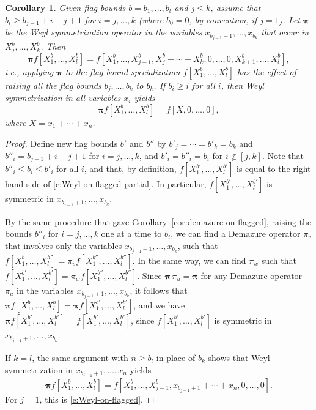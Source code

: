 \documentclass[12pt]{amsart}
\newtheorem{cor}[thm]{Corollary}
\theoremstyle{definition}
\theoremstyle{remark}
\newcommand{\pibold}{{\boldsymbol \pi }}
\newcommand{\Weyl}{\pibold }
\newcommand{\Dem}{\pi }
\begin{document}
\begin{cor}\label{cor:Weyl-on-flagged}
Given flag bounds $b = b_{1},\ldots,b_{l}$ and $j\leq k$, assume that
$b_{i}\geq b_{j-1}+i-j+1$ for $i=j,\ldots,k$ (where $b_{0} =0$, by
convention, if $j=1$).  Let $\Weyl $ be the Weyl symmetrization
operator in the variables $x_{b_{j-1}+1},\ldots, x_{b_{k}}$ that occur
in $X^{b}_{j}, \ldots, X^{b}_{k}$.  Then
\begin{equation}\label{e:Weyl-on-flagged-partial}
\Weyl f[X^b_{1},\ldots,X^b_{l}] =
f[X^{b}_{1},\ldots,X^{b}_{j-1},X^{b}_{j}+\cdots +X^{b}_{k},
0,\ldots,0, X^{b}_{k+1},\ldots, X^{b}_{l}],
\end{equation}
i.e., applying $\Weyl $ to the flag bound specialization
$f[X^b_{1},\ldots,X^b_{l}]$ has the effect of raising all the flag
bounds $b_{j},\ldots,b_{k}$ to $b_{k}$.  If $b_{i}\geq i$ for all $i$,
then Weyl symmetrization in all variables $x_{i}$ yields
\begin{equation}\label{e:Weyl-on-flagged}
\Weyl f[X^b_{1},\ldots,X^b_{l}] = f[X,0,\ldots,0],
\end{equation}
where $X = x_{1}+\cdots +x_{n}$.
\end{cor}

\begin{proof}
Define new flag bounds $b'$ and $b''$ by $b'_{j} =\cdots =b'_{k} =
b_{k}$ and $b''_{i} = b_{j-1}+i-j+1$ for $i=j,\ldots,k$, and $b'_{i} =
b''_{i} = b_{i}$ for $i\not \in [j,k]$.  Note that $b''_{i}\leq
b_{i}\leq b'_{i}$ for all $i$, and that, by definition,
$f[X^{b'}_{1},\ldots,X^{b'}_{l}]$ is equal to the right hand side of
\eqref{e:Weyl-on-flagged-partial}.  In particular,
$f[X^{b'}_{1},\ldots,X^{b'}_{l}]$ is symmetric in
$x_{b_{j-1}+1},\ldots, x_{b_{k}}$.

By the same procedure that gave
Corollary~\ref{cor:demazure-on-flagged}, raising the bounds $b''_{i}$
for $i=j,\ldots,k$ one at a time to $b_{i}$, we can find a Demazure
operator $\Dem _{v}$ that involves only the variables
$x_{b_{j-1}+1},\ldots, x_{b_{k}}$, such that
$f[X^b_{1},\ldots,X^b_{l}] = \Dem _{v}
f[X^{b''}_{1},\ldots,X^{b''}_{l}]$.  In the same way, we can find
$\Dem _{w}$ such that $f[X^{b'}_{1},\ldots,X^{b'}_{l}] = \Dem _{w}
f[X^{b''}_{1},\ldots,X^{b''}_{l}]$.  Since $\Weyl\, \Dem _{u} = \Weyl
$ for any Demazure operator $\Dem _{u}$ in the variables
$x_{b_{j-1}+1},\ldots, x_{b_{k}}$, it follows that $\Weyl
f[X^b_{1},\ldots,X^b_{l}] = \Weyl f[X^{b'}_{1},\ldots,X^{b'}_{l}]$,
and we have $\Weyl f[X^{b'}_{1},\ldots,X^{b'}_{l}] =
f[X^{b'}_{1},\ldots,X^{b'}_{l}]$, since
$f[X^{b'}_{1},\ldots,X^{b'}_{l}]$ is symmetric in
$x_{b_{j-1}+1},\ldots, x_{b_{k}}$.

If $k=l$, the same argument with $n\geq b_{l}$ in place of $b_{k}$
shows that Weyl symmetrization in $x_{b_{j-1}+1},\ldots,x_{n}$ yields
\begin{equation}\label{e:Weyl-on-flagged-tail}
\Weyl f[X^b_{1},\ldots,X^b_{l}] = f[X^{b}_{1}, \ldots, X^{b}_{j-1},
x_{b_{j-1}+1} +\cdots + x_{n}, 0,\ldots,0].
\end{equation}
For $j=1$, this is \eqref{e:Weyl-on-flagged}.
\end{proof}
\end{document}
